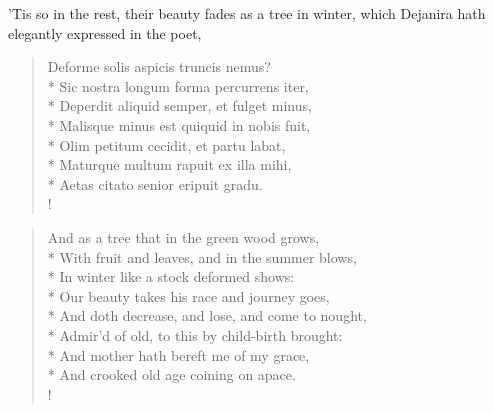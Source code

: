 'Tis so in the rest, their beauty fades as a tree in winter, which Dejanira
hath elegantly expressed in the poet,
%
\begin{latin}
\begin{verse}%
Deforme solis aspicis truncis nemus?\\*
Sic nostra longum forma percurrens iter,\\*
Deperdit aliquid semper, et fulget minus,\\*
Malisque minus est quiquid in nobis fuit,\\*
Olim petitum cecidit, et partu labat,\\*
Maturque multum rapuit ex illa mihi,\\*
Aetas citato senior eripuit gradu.\\!
\end{verse}%
\end{latin}
\translationrule%
\begin{verse}%
And as a tree that in the green wood grows,\\*
With fruit and leaves, and in the summer blows,\\*
In winter like a stock deformed shows:\\*
Our beauty takes his race and journey goes,\\*
And doth decrease, and lose, and come to nought,\\*
Admir'd of old, to this by child-birth brought:\\*
And mother hath bereft me of my grace,\\*
And crooked old age coining on apace.\\!
\end{verse}%
%

